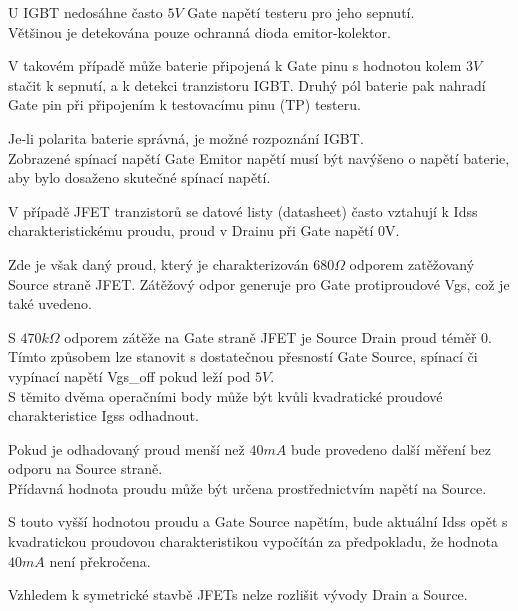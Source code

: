 U IGBT nedosáhne často \(5V\) Gate napětí testeru pro jeho sepnutí.\\
Většinou je detekována pouze ochranná dioda emitor-kolektor.

V takovém případě může baterie připojená k Gate pinu s hodnotou kolem \(3V\) stačit k sepnutí,
a k detekci tranzistoru IGBT. Druhý pól baterie pak nahradí Gate pin při připojením k testovacímu pinu (TP) testeru.

Je-li polarita baterie správná, je možné rozpoznání IGBT.
\\Zobrazené spínací napětí Gate Emitor napětí musí být navýšeno o napětí baterie,
aby bylo dosaženo skutečné spínací napětí.

V případě JFET tranzistorů se datové listy (datasheet) často vztahují k Idss charakteristickému proudu,
proud v Drainu při Gate napětí 0V.

Zde je však daný proud, který je charakterizován \(680\Omega\) odporem zatěžovaný Source straně JFET.
Zátěžový odpor generuje pro Gate protiproudové Vgs, což je také uvedeno.

S \(470k\Omega\) odporem zátěže na Gate straně JFET je Source Drain proud téměř 0.
\\Tímto způsobem lze stanovit s dostatečnou přesností Gate Source, spínací či vypínací napětí Vgs\_off pokud leží pod \(5V\).
\\S těmito dvěma operačními body může být kvůli kvadratické proudové charakteristice Igss odhadnout.

Pokud je odhadovaný proud menší než \(40mA\) bude provedeno další měření bez odporu na Source straně.\\
Přídavná hodnota proudu může být určena prostřednictvím napětí na Source.

S touto vyšší hodnotou proudu a Gate Source napětím, bude aktuální Idss opět s kvadratickou proudovou charakteristikou vypočítán za předpokladu, že hodnota \(40mA\) není překročena.

Vzhledem k symetrické stavbě JFETs nelze rozlišit vývody Drain a Source.


